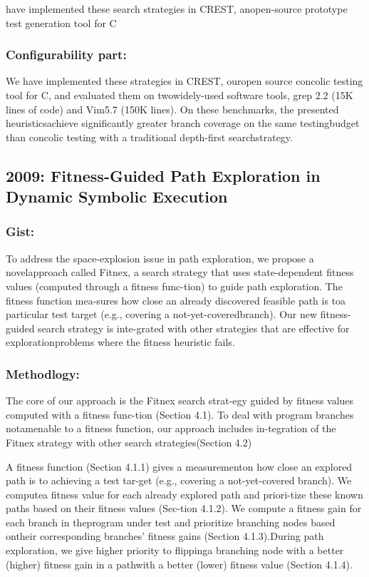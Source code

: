 \documentclass[	runningheads,
				a4paper]{llncs}
\begin{document}
have implemented these search strategies in CREST, anopen-source prototype test generation tool for C

\subsubsection{Configurability part:}
We have implemented these strategies in CREST, ouropen source concolic testing tool for C, and evaluated them on twowidely-used software tools, grep 2.2 (15K lines of code) and Vim5.7 (150K lines). On these benchmarks, the presented heuristicsachieve significantly greater branch coverage on the same testingbudget than concolic testing with a traditional depth-first searchstrategy.


\subsection{2009: Fitness-Guided Path Exploration in Dynamic Symbolic Execution}

\subsubsection{Gist:}
To address the space-explosion  issue  in  path  exploration,  we  propose  a  novelapproach called Fitnex, a search strategy that uses state-dependent fitness values (computed through a fitness func-tion) to guide path exploration.  The fitness function mea-sures how close an already discovered feasible path is toa  particular  test  target  (e.g.,  covering  a  not-yet-coveredbranch).   Our new fitness-guided search strategy is  inte-grated with other strategies that are effective for explorationproblems where the fitness heuristic fails.

\subsubsection{Methodlogy:}
The core of our approach is the Fitnex search strat-egy guided by fitness values computed with a fitness func-tion (Section 4.1).  To deal with program branches notamenable to a fitness function, our approach includes in-tegration of the Fitnex strategy with other search strategies(Section 4.2)

A fitness function (Section 4.1.1) gives a measurementon how close an explored path is to achieving a test tar-get (e.g., covering a not-yet-covered branch). We computea fitness value for each already explored path and priori-tize these known paths based on their fitness values (Sec-tion 4.1.2). We compute a fitness gain for each branch in theprogram under test and prioritize branching nodes based ontheir corresponding branches’ fitness gains (Section 4.1.3).During path exploration, we give higher priority to flippinga branching node with a better (higher) fitness gain in a pathwith a better (lower) fitness value (Section 4.1.4).
\end{document}
